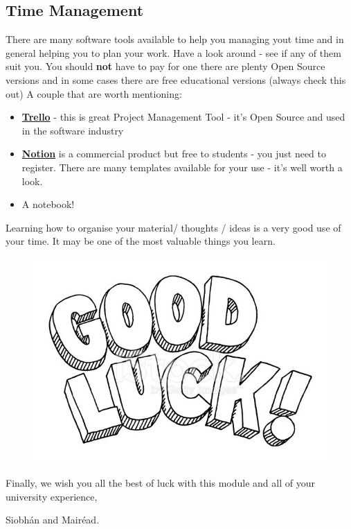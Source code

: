 \documentclass{article}
\begin{document}
\subsection{Time Management}
There are many software tools available to help you managing yout time and in general helping you to plan your work. Have a look around - see if any of them suit you. You should \textbf{not} have to pay for one there are plenty Open Source versions and in some cases there are free educational versions (always check this out)
A couple that are worth mentioning: 
\begin{itemize}
    \item \href{https://trello.com/en}{\textbf{Trello}} - this is  great Project Management Tool - it's Open Source and used in the software industry
    \item \href{https://www.notion.so/}{\textbf{Notion}} is a commercial product but free to students - you just need to register. There are many templates available for your use - it's well worth a look. 
    \item A notebook! 
\end{itemize}
Learning how to organise your material/ thoughts / ideas is a very good use of your time. It may be one of the most valuable things you learn. 
\vspace{2cm}
\begin{figure}[h]
    \centering
    \includegraphics[width=.8\textwidth]{img/good-luck.jpeg}

    \end{figure}

Finally, we wish you all the best of luck with this module and all of your university experience,
\vspace{1cm}

Siobh\'an and Mair\'ead.
\end{document}
